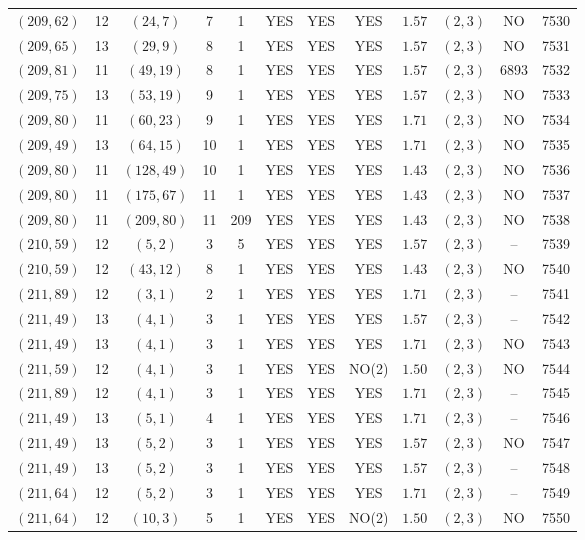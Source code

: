 \begin{longtable}{|c|c|c|c|c|c|c|c|c|c|c|c|}
$(209,62)$ & 12 & $(24,7)$ & 7 & 1 & YES & YES & YES & $1.57$ & $(2,3)$ & NO & 7530\\
$(209,65)$ & 13 & $(29,9)$ & 8 & 1 & YES & YES & YES & $1.57$ & $(2,3)$ & NO & 7531\\
$(209,81)$ & 11 & $(49,19)$ & 8 & 1 & YES & YES & YES & $1.57$ & $(2,3)$ & 6893 & 7532\\
$(209,75)$ & 13 & $(53,19)$ & 9 & 1 & YES & YES & YES & $1.57$ & $(2,3)$ & NO & 7533\\
$(209,80)$ & 11 & $(60,23)$ & 9 & 1 & YES & YES & YES & $1.71$ & $(2,3)$ & NO & 7534\\
$(209,49)$ & 13 & $(64,15)$ & 10 & 1 & YES & YES & YES & $1.71$ & $(2,3)$ & NO & 7535\\
$(209,80)$ & 11 & $(128,49)$ & 10 & 1 & YES & YES & YES & $1.43$ & $(2,3)$ & NO & 7536\\
$(209,80)$ & 11 & $(175,67)$ & 11 & 1 & YES & YES & YES & $1.43$ & $(2,3)$ & NO & 7537\\
$(209,80)$ & 11 & $(209,80)$ & 11 & 209 & YES & YES & YES & $1.43$ & $(2,3)$ & NO & 7538\\
$(210,59)$ & 12 & $(5,2)$ & 3 & 5 & YES & YES & YES & $1.57$ & $(2,3)$ & -- & 7539\\
$(210,59)$ & 12 & $(43,12)$ & 8 & 1 & YES & YES & YES & $1.43$ & $(2,3)$ & NO & 7540\\
$(211,89)$ & 12 & $(3,1)$ & 2 & 1 & YES & YES & YES & $1.71$ & $(2,3)$ & -- & 7541\\
$(211,49)$ & 13 & $(4,1)$ & 3 & 1 & YES & YES & YES & $1.57$ & $(2,3)$ & -- & 7542\\
$(211,49)$ & 13 & $(4,1)$ & 3 & 1 & YES & YES & YES & $1.71$ & $(2,3)$ & NO & 7543\\
$(211,59)$ & 12 & $(4,1)$ & 3 & 1 & YES & YES & NO(2) & $1.50$ & $(2,3)$ & NO & 7544\\
$(211,89)$ & 12 & $(4,1)$ & 3 & 1 & YES & YES & YES & $1.71$ & $(2,3)$ & -- & 7545\\
$(211,49)$ & 13 & $(5,1)$ & 4 & 1 & YES & YES & YES & $1.71$ & $(2,3)$ & -- & 7546\\
$(211,49)$ & 13 & $(5,2)$ & 3 & 1 & YES & YES & YES & $1.57$ & $(2,3)$ & NO & 7547\\
$(211,49)$ & 13 & $(5,2)$ & 3 & 1 & YES & YES & YES & $1.57$ & $(2,3)$ & -- & 7548\\
$(211,64)$ & 12 & $(5,2)$ & 3 & 1 & YES & YES & YES & $1.71$ & $(2,3)$ & -- & 7549\\
$(211,64)$ & 12 & $(10,3)$ & 5 & 1 & YES & YES & NO(2) & $1.50$ & $(2,3)$ & NO & 7550\\

\end{longtable}
